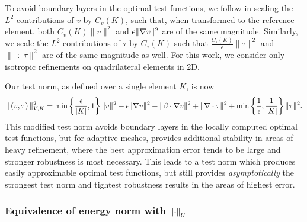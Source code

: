 To avoid boundary layers in the optimal test functions, we follow \cite{DPGrobustness} in scaling the $L^2$ contributions of $v$ by $C_v(K)$, such that, when transformed to the reference element, both $C_v(K)\|v\|^2$ and $\epsilon\|\grad v\|^2$ are of the same magnitude. Similarly, we scale the $L^2$ contributions of $\tau$ by $C_\tau(K)$ such that $\frac{C_\tau(K)}{\epsilon} \|\tau\|^2$ and $\|\div \tau\|^2$ are of the same magnitude as well. For this work, we consider only isotropic refinements on quadrilateral elements in 2D.

Our test norm, as defined over a single element $K$, is now
\[
\|\left(v,\tau\right)\|_{V,K}^2 = \min\left\{\frac{\epsilon}{|K|},1\right\}\|v\|^2 + \epsilon \|\grad v\|^2 + \|\beta \cdot \grad v\|^2 + \| \div \tau\|^2 + \min\left\{\frac{1}{\epsilon},\frac{1}{|K|}\right\}\|\tau\|^2.
\]
This modified test norm avoids boundary layers in the locally computed optimal test functions, but for adaptive meshes, provides additional stability in areas of heavy refinement, where the best approximation error tends to be large and stronger robustness is most necessary.  This leads to a test norm which produces easily approximable optimal test functions, but still provides \textit{asymptotically} the strongest test norm and tightest robustness results in the areas of highest error. 

\subsubsection{Equivalence of energy norm with $\nor{\cdot}_U$}
\label{sec:main_bounds}

